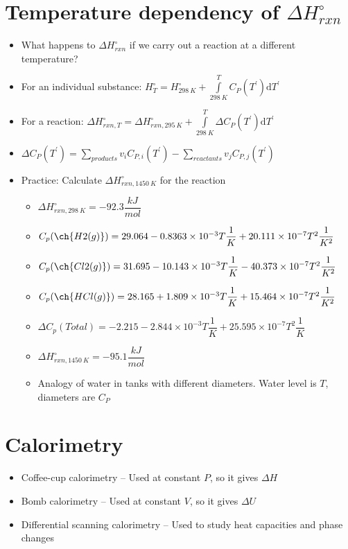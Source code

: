 \documentclass[12pt, openany, letterpaper]{memoir}
\begin{document}
\section*{Temperature dependency of $\Delta H^\circ_{rxn}$}
\begin{itemize}
	\item What happens to $\Delta H^\circ_{rxn}$ if we carry out a reaction at a different temperature?
	\item For an individual substance: $H_T^\circ = H^\circ_{298~K} + \int\limits_{298~K}^T C_P(T^\prime)\mathrm{d}T^\prime$
	\item For a reaction: $\Delta H_{rxn,T}^\circ = \Delta H_{rxn, 295~K}^\circ + \int\limits_{298~K}^{T}\Delta C_P(T^\prime)\mathrm{d}T^\prime$
	\item $\Delta C_P(T^\prime) = \sum\limits_{products}v_iC_{P,i}(T^\prime) - \sum\limits_{reactants}v_jC_{P,j}(T^\prime)$
	\item Practice: Calculate $\Delta H_{rxn, 1450~K}^\circ$ for the reaction 
	\begin{itemize}
		\item $\Delta H^\circ_{rxn,298~K} = -92.3\dfrac{kJ}{mol}$
		\item $C_p(\ch{H2 (g)}) = 29.064 -0.8363\times10^{-3}T\dfrac{1}{K} +20.111\times10^{-7}T^2\dfrac{1}{K^2}$
		\item $C_p(\ch{Cl2 (g)}) = 31.695 -10.143\times10^{-3}T\dfrac{1}{K} -40.373\times10^{-7}T^2\dfrac{1}{K^2}$
		\item $C_p(\ch{HCl (g)}) = 28.165 +1.809\times10^{-3}T\dfrac{1}{K} +15.464\times10^{-7}T^2\dfrac{1}{K^2}$
		\item $\Delta C_p(Total) = -2.215-2.844\times10^{-3}T\dfrac{1}{K}+25.595\times10^{-7}T^2\dfrac{1}{K}$
		\item $\Delta H^\circ_{rxn, 1450~K} = -95.1\dfrac{kJ}{mol}$
		\item Analogy of water in tanks with different diameters. Water level is $T$, diameters are $C_P$
	\end{itemize}
\end{itemize}
\section*{Calorimetry}
\begin{itemize}
	\item Coffee-cup calorimetry -- Used at constant $P$, so it gives $\Delta H$
	\item Bomb calorimetry -- Used at constant $V$, so it gives $\Delta U$
	\item Differential scanning calorimetry -- Used to study heat capacities and phase changes
\end{itemize}
\end{document}
